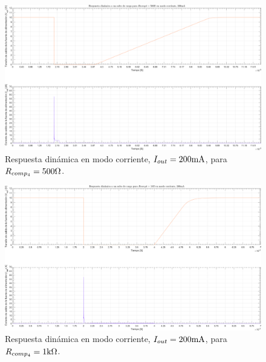 \clearpage

\begin{figure}[H] %
\begin{center}
\includegraphics[width=1.1 \textwidth, angle=90]{./img/plots/dynamic/power_supply_RCOMP4_500_STEP_Modo4.png}
\caption{\label{fig:fig_power_supply_RCOMP4_STEP_500_Modo4}\footnotesize{Respuesta dinámica en modo corriente, $I_{out} = 200 \si[per-mode=symbol]{\milli\ampere}$, para $R_{comp_{4}} = 500 \si[per-mode=symbol]{\ohm} $.}}
\end{center}
\end{figure}

\clearpage

\begin{figure}[H] %
\begin{center}
\includegraphics[width=1.1 \textwidth, angle=90]{./img/plots/dynamic/power_supply_RCOMP4_1k_STEP_Modo4.png}
\caption{\label{fig:fig_power_supply_RCOMP4_STEP_1k_Modo4}\footnotesize{Respuesta dinámica en modo corriente, $I_{out} = 200 \si[per-mode=symbol]{\milli\ampere}$, para $R_{comp_{4}} = 1 \si[per-mode=symbol]{\kilo\ohm} $.}}
\end{center}
\end{figure}

